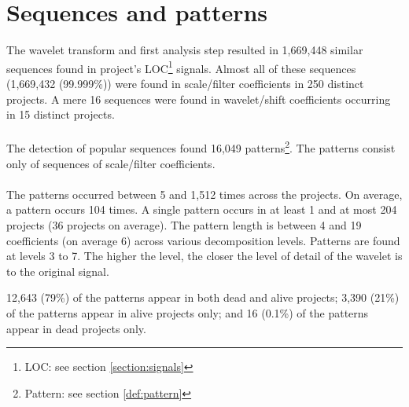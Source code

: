 \section{Sequences and patterns}
The wavelet transform and first analysis step resulted in 1,669,448 similar
sequences found in project's LOC\footnote{LOC: see section
\ref{section:signals}} signals. Almost all of these sequences (1,669,432
(99.999\%)) were found in scale/filter coefficients in 250 distinct projects.
A mere 16 sequences were found in wavelet/shift coefficients occurring in 15
distinct projects.

\paragraph{}
The detection of popular sequences found 16,049 patterns\footnote{Pattern:
see section \ref{def:pattern}}. The patterns consist only of sequences
of scale/filter coefficients.

\paragraph{}
The patterns occurred between 5 and 1,512 times across the projects. On
average, a pattern occurs 104 times. A single pattern occurs in at least 1 and
at most 204 projects (36 projects on average). The pattern length is between 4
and 19 coefficients (on average 6) across various decomposition levels.
Patterns are found at levels 3 to 7. The higher the level, the closer the level
of detail of the wavelet is to the original signal.

12,643 (79\%) of the patterns appear in both dead and alive projects; 3,390
(21\%) of the patterns appear in alive projects only; and 16 (0.1\%) of the
patterns appear in dead projects only.


\begin{comment}
- Factual results
- Tables and figures for clarification

This chapter presents and clarifies the results obtained during the research.
The focus should be on the factual results, not the interpretation or
discussion. Tables and graphics should be used to increase the clarity of the
results where applicable.
Have a look at the the results chapter in this example thesis on Paul’s
homepage\footnote{http://homepages.cwi.nl/~paulk/thesesMasterSoftwareEngineering/2006/ArnoldLankamp.pdf}.
\end{comment}
